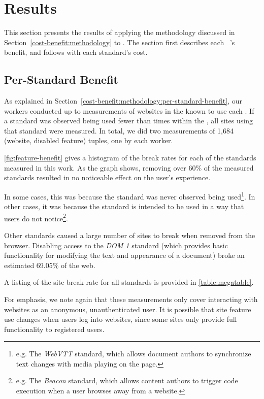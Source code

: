 \section{Results}
\label{cost-benefit:results}

This section presents the results of applying the methodology discussed in
Section~\ref{cost-benefit:methodology} to \FFWithVersion.  The section first
describes each \WAS~'s benefit, and follows with each standard's cost.




\subsection{Per-Standard Benefit}
\label{cost-benefit:results:results-benefit}

As explained in Section~\ref{cost-benefit:methodology:per-standard-benefit},
our workers conducted up to \NumSitesPerStandard measurements of websites in
the \ATK known to use each \WAS. If a standard was observed being used
fewer than \NumSitesPerStandard times within the \ATK, all sites using that
standard were measured. In total, we did two measurements of 1,684 (website,
disabled feature) tuples, one by each worker.

\ref{fig:feature-benefit} gives a histogram of the break rates for each of
the \NumStandards standards measured in this work.  As the graph shows, removing
over 60\% of the measured standards resulted in no noticeable effect on the
user's experience.

In some cases, this was because the standard was never observed being
used\footnote{e.g. The \textit{WebVTT} standard, which allows document authors
to synchronize text changes with media playing on the page.}.  In other cases,
it was because the standard is intended to be used in a way that users do not
notice\footnote{e.g. The \textit{Beacon} standard, which allows content authors
to trigger code execution when a user browses away from a website.}.

Other standards caused a large number of sites to break when removed from the
browser.  Disabling access to the \textit{DOM 1} standard (which provides basic
functionality for modifying the text and appearance of a document) broke an
estimated 69.05\% of the web.

A listing of the site break rate for all \NumStandards standards is provided
in \ref{table:megatable}.

For emphasis, we note again that these measurements only cover interacting with
websites as an anonymous, unauthenticated user. It is possible that site
feature use changes when users log into websites, since some sites only provide
full functionality to registered users.


